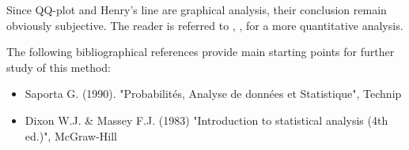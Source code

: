             {
              Since QQ-plot and Henry's line are graphical analysis, their conclusion remain obviously subjective. The reader is referred to , ,  for a more quantitative analysis.

              The following bibliographical references provide main starting points for further study of this method:
              \begin{itemize}
              \item Saporta G. (1990). "Probabilités, Analyse de données et Statistique", Technip
              \item Dixon W.J. \& Massey F.J. (1983) "Introduction to statistical analysis (4th ed.)", McGraw-Hill
              \end{itemize}
            }
